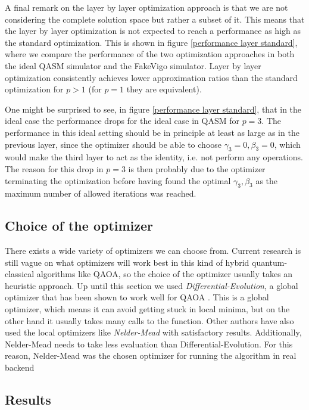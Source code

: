 A final remark on the layer by layer optimization approach is that we are not considering the complete solution space but rather a subset of it. This means that the layer by layer optimization is not expected to reach a performance as high as the standard optimization. This is shown in figure \ref{performance layer standard}, where we compare the performance of the two optimization approaches in both the ideal QASM simulator and the FakeVigo simulator. Layer by layer optimization consistently achieves lower approximation ratios than the standard optimization for $p>1$ (for $p=1$ they are equivalent). 

One might be surprised to see, in figure \ref{performance layer standard}, that in the ideal case the performance drops for the ideal case in QASM for $p=3$. The performance in this ideal setting should be in principle at least as large as in the previous layer, since the optimizer should be able to choose $\gamma_3=0, \beta_3=0$, which would make the third layer to act as the identity, i.e. not perform any operations. The reason for this drop in $p=3$ is then probably due to the optimizer terminating the optimization before having found the optimal $\gamma_3, \beta_3$ as the maximum number of allowed iterations was reached.


\subsection{Choice of the optimizer}

There exists a wide variety of optimizers we can choose from. Current research is still vague on what optimizers will work best in this kind of hybrid quantum-classical algorithms like QAOA, so the choice of the optimizer usually takes an heuristic approach. Up until this section we used \textit{Differential-Evolution}, a global optimizer that has been shown to work well for QAOA \cite{alam2019analysis}. This is a global optimizer, which means it can avoid getting stuck in local minima, but on the other hand it usually takes many calls to the function. Other authors \cite{Lacroix_2020} have also used the local optimizers like \textit{Nelder-Mead} with satisfactory results. Additionally, Nelder-Mead needs to take less evaluation than Differential-Evolution. For this reason, Nelder-Mead was the chosen optimizer for running the algorithm in real backend


\subsection{Results}

